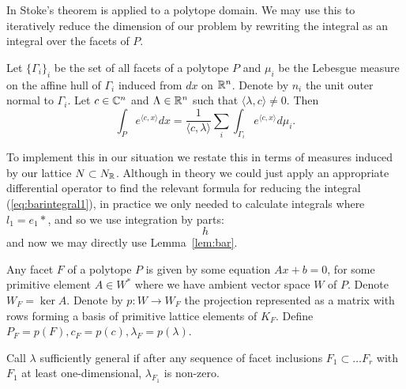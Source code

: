 In \cite{barvinok} Stoke's theorem is applied to a polytope domain. We may use this to iteratively reduce the dimension of our problem by rewriting the integral as an integral over the facets of \(P\).
\begin{lemma} \label{lem:bar}
Let \(\{\Gamma_i\}_i\) be the set of all facets of a polytope \(P\) and \(\mu_i\) be the Lebesgue measure on the affine hull of \(\Gamma_i\) induced from \(dx\) on \(\mathbb{R}^n\). Denote by \(n_i\) the unit outer normal to \(\Gamma_i\). Let \(c \in \mathbb{C}^n\) and \(\Lambda \in \mathbb{R}^n\) such that \(\langle \lambda, c \rangle \neq 0\). Then
\[
\int_P e^{\langle c, x \rangle} dx = \frac{1}{\langle c , \lambda \rangle} \sum_i \int_{\Gamma_i} e^{\langle c, x \rangle} d \mu_i.
\]
\end{lemma}
To implement this in our situation we restate this in terms of measures induced by our lattice \(N \subset N_{\mathbb{R}}\). Although in theory we could just apply an appropriate differential operator to find the relevant formula for reducing the integral (\ref{eq:barintegral1}), in practice we only needed to calculate integrals where \(l_1 = e_1*\), and so we use integration by parts:
\[
h
\]
and now we may directly use Lemma~\ref{lem:bar}.

Any facet \(F\) of a polytope \(P\) is given by some equation \(Ax + b = 0\), for some primitive element \(A \in W^*\) where we have ambient vector space \(W\) of \(P\). Denote \(W_F = \ker A\). Denote by \(p: W \to W_F\) the projection  represented as a matrix with rows forming a basis of primitive lattice elements of \(K_F\). Define \(P_F = p(F), c_F = p(c), \lambda_F = p(\lambda)\).

Call \(\lambda\) sufficiently general if after any sequence of facet inclusions \(F_1 \subset \dots F_r\) with \(F_1\) at least one-dimensional, \(\lambda_{F_1}\) is non-zero.

